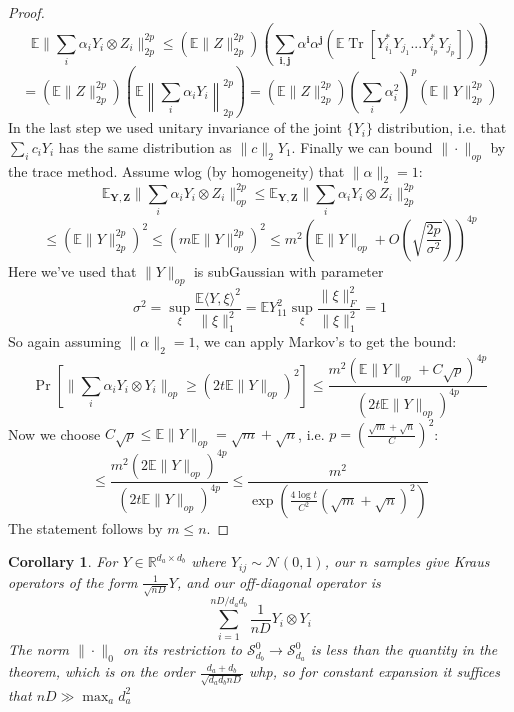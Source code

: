 \documentclass{article}
\newtheorem{corollary}[theorem]{Corollary}
\newcommand{\R}{{\mathbb{R}}}
\renewcommand{\vec}{\bm}
\newcommand{\E}{\mathbb{E}}
\newcommand\Sym{\mathcal{S}}
\newcommand\tr{\operatorname{Tr}}
\begin{document}
\begin{proof}
\[ \E \|\sum_{i} \alpha_{i} Y_{i} \otimes Z_{i}\|_{2p}^{2p}
\leq \left( \E \|Z\|_{2p}^{2p} \right) \left( \sum_{\vec{i},\vec{j}} \alpha^{\vec{i}} \alpha^{\vec{j}} (\E \tr [ Y_{i_{1}}^{*} Y_{j_{1}} ... Y_{i_{p}}^{*} Y_{j_{p}} ] ) \right) \]
\[ = \left( \E \|Z\|_{2p}^{2p} \right) \left( \E \left\| \sum_{i} \alpha_{i} Y_{i} \right\|_{2p}^{2p} \right)
= \left( \E \|Z\|_{2p}^{2p} \right) \left( \sum_{i} \alpha_{i}^{2} \right)^{p} \left( \E \|Y\|_{2p}^{2p} \right)    \]
In the last step we used unitary invariance of the joint $\{Y_{i}\}$ distribution, i.e. that $\sum_{i} c_{i} Y_{i}$ has the same distribution as $\|c\|_{2} Y_{1}$.
Finally we can bound $\|\cdot\|_{op}$ by the trace method. Assume wlog (by homogeneity) that $\|\alpha\|_{2} = 1$:
\[ \E_{\vec Y, \vec Z} \|\sum_{i} \alpha_{i} Y_{i} \otimes Z_{i} \|_{op}^{2p} \leq \E_{\vec Y, \vec Z} \|\sum_{i} \alpha_{i} Y_{i} \otimes Z_{i} \|_{2p}^{2p} \]
\[ \leq ( \E \|Y\|_{2p}^{2p} )^{2} \leq ( m \E \|Y\|_{op}^{2p} )^{2} \leq m^{2} \left(\E \|Y\|_{op} + O(\sqrt{\frac{2p}{\sigma^{2}}})  \right)^{4p} \]
Here we've used that $\|Y\|_{op}$ is subGaussian with parameter 
\[ \sigma^{2} = \sup_{\xi} \frac{ \E \langle Y, \xi \rangle^{2} }{\|\xi\|_{1}^{2}} = \E Y_{11}^{2} \sup_{\xi} \frac{ \|\xi\|_{F}^{2} }{\|\xi\|_{1}^{2} } = 1     \]
So again assuming $\|\alpha\|_{2} = 1$, we can apply Markov's to get the bound: 
\[ \Pr[\|\sum_{i} \alpha_{i} Y_{i} \otimes Y_{i}\|_{op} \geq (2t \E \|Y\|_{op})^{2} ] \leq    \frac{m^{2} (\E\|Y\|_{op} + C \sqrt{p} )^{4p}}{(2t \E\|Y\|_{op})^{4p}}    \]
Now we choose $C\sqrt{p} \leq \E \|Y\|_{op} = \sqrt{m} + \sqrt{n}$, i.e. $p = \left( \frac{\sqrt{m} + \sqrt{n}}{C} \right)^{2}$: 
\[ \leq \frac{m^{2} (2\E \|Y\|_{op})^{4p}}{(2t \E \|Y\|_{op})^{4p}} \leq \frac{m^{2}}{\exp(\frac{4 \log t}{C^{2}} (\sqrt{m} + \sqrt{n})^{2})}    \]
The statement follows by $m \leq n$. 
\end{proof}


\begin{corollary}
For $Y \in \R^{d_{a} \times d_{b}}$ where $Y_{ij} \sim \mathcal{N}(0,1)$, our $n$ samples give Kraus operators of the form $\frac{1}{\sqrt{nD}} Y$, and our off-diagonal operator is
\[ \sum_{i=1}^{nD/d_{a}d_{b}} \frac{1}{nD} Y_{i} \otimes Y_{i}   \]
The norm $\|\cdot\|_{0}$ on its restriction to $\Sym_{d_{b}}^{0} \to \Sym_{d_{a}}^{0}$ is less than the quantity in the theorem, which is on the order $\frac{d_{a}+d_{b}}{\sqrt{d_{a} d_{b} nD}}$ whp, so for constant expansion it suffices that $nD \gg \max_{a} d_{a}^{2}$
\end{corollary}
\end{document}
